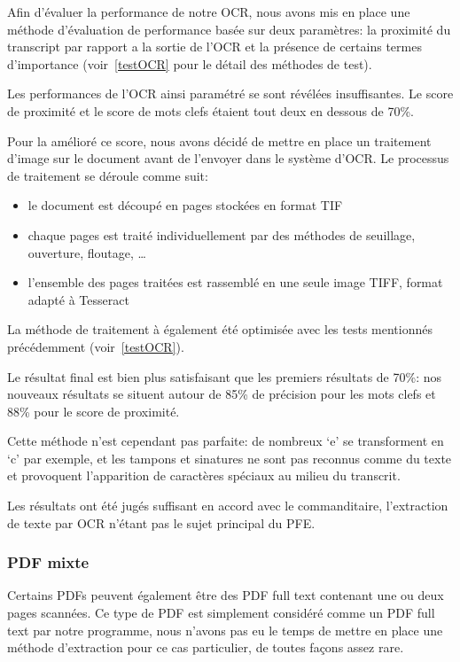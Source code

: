 Afin d'évaluer la performance de notre OCR, nous avons mis en place une méthode d'évaluation de performance basée sur deux paramètres: la proximité du transcript par rapport a la sortie de l'OCR et la présence de certains termes d'importance (voir~\ref{testOCR} pour le détail des méthodes de test).

Les performances de l'OCR ainsi paramétré se sont révélées insuffisantes.
Le score de proximité et le score de mots clefs étaient tout deux en dessous de 70\%.


Pour la amélioré ce score, nous avons décidé de mettre en place un traitement d'image sur le document avant de l'envoyer dans le système d'OCR\@.
Le processus de traitement se déroule comme suit:
\begin{itemize}
\item le document est découpé en pages stockées en format TIF
\item chaque pages est traité individuellement par des méthodes de seuillage, ouverture, floutage, \ldots
\item l'ensemble des pages traitées est rassemblé en une seule image TIFF, format adapté à Tesseract
\end{itemize}

La méthode de traitement à également été optimisée avec les tests mentionnés précédemment (voir~\ref{testOCR}).

Le résultat final est bien plus satisfaisant que les premiers résultats de 70\%: nos nouveaux résultats se situent autour de 85\% de précision pour les mots clefs et 88\% pour le score de proximité.

Cette méthode n'est cependant pas parfaite: de nombreux `e' se transforment en `c' par exemple, et les tampons et sinatures ne sont pas reconnus comme du texte et provoquent l'apparition de caractères spéciaux au milieu du transcrit.

Les résultats ont été jugés suffisant en accord avec le commanditaire, l'extraction de texte par OCR n'étant pas le sujet principal du PFE\@.

\subsubsection{PDF mixte}
Certains PDFs peuvent également être des PDF full text contenant une ou deux pages scannées.
Ce type de PDF est simplement considéré comme un PDF full text par notre programme, nous n'avons pas eu le temps de mettre en place une méthode d'extraction pour ce cas particulier, de toutes façons assez rare.

